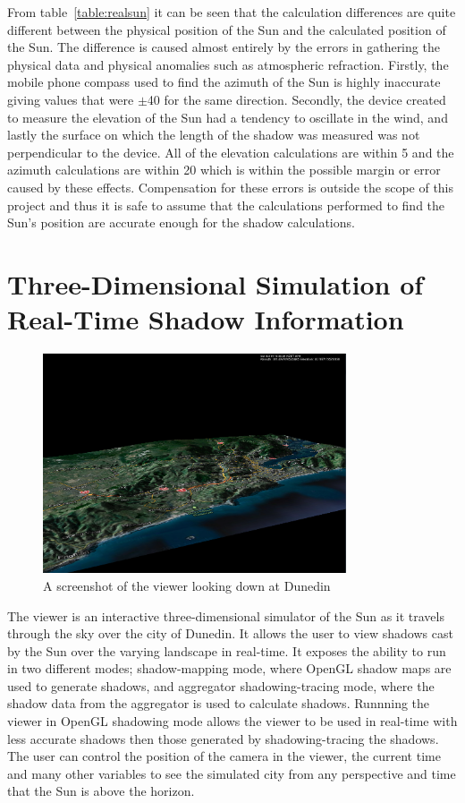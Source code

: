\documentclass[12pt]{report}
\begin{document}
From table~\ref{table:realsun} it can be seen that the calculation differences are quite different between the physical position of the Sun and the calculated position of the Sun. The difference is caused almost entirely by the errors in gathering the physical data and physical anomalies such as atmospheric refraction. Firstly, the mobile phone compass used to find the azimuth of the Sun is highly inaccurate giving values that were $\pm$40{\degree} for the same direction. Secondly, the device created to measure the elevation of the Sun had a tendency to oscillate in the wind, and lastly the surface on which the length of the shadow was measured was not perpendicular to the device. All of the elevation calculations are within 5{\degree} and the azimuth calculations are within 20{\degree} which is within the possible margin or error caused by these effects. Compensation for these errors is outside the scope of this project and thus it is safe to assume that the calculations performed to find the Sun's position are accurate enough for the shadow calculations.

\chapter{Three-Dimensional Simulation of Real-Time Shadow Information}

\begin{figure}[h]
\centering
\includegraphics[width=0.8\textwidth]{viewer.png}
\caption{A screenshot of the viewer looking down at Dunedin}
\label{image:viewer}
\end{figure}

The viewer is an interactive three-dimensional simulator of the Sun as it travels through the sky over the city of Dunedin. It allows the user to view shadows cast by the Sun over the varying landscape in real-time. It exposes the ability to run in two different modes; shadow-mapping mode, where OpenGL shadow maps are used to generate shadows, and aggregator shadowing-tracing mode, where the shadow data from the aggregator is used to calculate shadows. Runnning the viewer in OpenGL shadowing mode allows the viewer to be used in real-time with less accurate shadows then those generated by shadowing-tracing the shadows. The user can control the position of the camera in the viewer, the current time and many other variables to see the simulated city from any perspective and time that the Sun is above the horizon.
\end{document}
